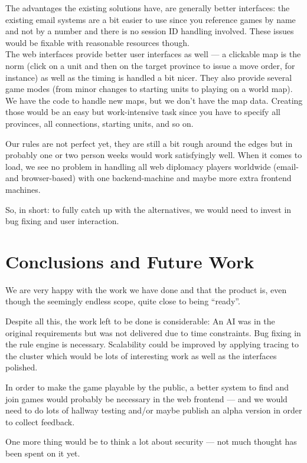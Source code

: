 \documentclass[11pt,a4paper]{report}
\begin{document}
The advantages the existing solutions have, are generally better interfaces:
the existing email systems are a bit easier to use since you reference games by
name and not by a number and there is no session ID handling involved.
These issues would be fixable with reasonable resources though. \\
The web interfaces provide better user interfaces as well --- a clickable map
is the norm (click on a unit and then on the target province to issue a move
order, for instance) as well as the timing is handled a bit nicer. They also
provide several game modes (from minor changes to starting units to playing on
a world map). We have the code to handle new maps, but we don't have the map
data. Creating those would be an easy but work-intensive task since you have
to specify all provinces, all connections, starting units, and so on.

Our rules are not perfect yet, they are still a bit rough around the edges but
in probably one or two person weeks would work satisfyingly well.
When it comes to load, we see no problem in handling all web diplomacy
players worldwide (email- and browser-based) with one backend-machine and maybe
more extra frontend machines.

So, in short: to fully catch up with the alternatives, we would need to invest
in bug fixing and user interaction.

\chapter{Conclusions and Future Work}
We are very happy with the work we have done and that the product is, even
though the seemingly endless scope, quite close to being ``ready''.

Despite all this, the work left to be done is considerable:
An AI was in the original requirements but was not delivered due to time
constraints.
Bug fixing in the rule engine is necessary. Scalability could be improved by
applying tracing to the cluster which would be lots of interesting work as well
as the interfaces polished.

In order to make the game playable by the public, a better system to find and
join games would probably be necessary in the web frontend --- and we would
need to do lots of hallway testing and/or maybe publish an alpha version in
order to collect feedback.

One more thing would be to think a lot about security --- not much thought has
been spent on it yet.
\end{document}
